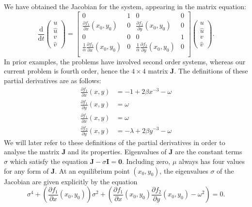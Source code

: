 We have obtained the Jacobian for the system, appearing in the matrix equation:
\begin{equation}
    \frac{\mathrm{d}}{\mathrm{d}t} \begin{pmatrix}
        u \\
        \hat{u} \\
        v \\
        \hat{v}
    \end{pmatrix} = \begin{bmatrix}
        0 & 1 & 0 & 0 \\
        \frac{\partial f_1}{\partial x}(x_0,y_0) & 0 & \frac{\partial f_1}{\partial y}(x_0,y_0) & 0 \\
        0 & 0 & 0 & 1 \\
        \frac{1}{\alpha}\frac{\partial f_2}{\partial x}(x_0,y_0) & 0 & \frac{1}{\alpha}\frac{\partial f_2}{\partial y}(x_0,y_0) & 0 \\
    \end{bmatrix} \begin{pmatrix}
        u \\
        \hat{u} \\
        v \\
        \hat{v}
    \end{pmatrix}.
    \label{eqn:twomass_matrix_jacobian_quad}
\end{equation}
In prior examples, the problems have involved second order systems,
whereas our current problem is fourth order,
hence the \(4\times4\) matrix \(\mathbf{J}\).
The definitions of these partial derivatives are as follows:
\begin{equation}
    \begin{aligned}
        \frac{\partial f_1}{\partial x}(x,y) &= -1 + 2\beta x^{-3} - \omega \\
        \frac{\partial f_1}{\partial y}(x,y) &= \omega \\
        \frac{\partial f_1}{\partial x}(x,y) &= \omega \\
        \frac{\partial f_2}{\partial y}(x,y) &= -\lambda +2\beta y^{-3} - \omega
    \end{aligned}
    \label{eqn:twomass_partial_derivatives}
\end{equation}
We will later refer to these definitions of the partial derivatives in order to analyse the matrix $\mathbf{J}$ and its properties.
Eigenvalues of $\mathbf{J}$ are the constant terms $\sigma$ which satisfy the equation $\mathbf{J} - \sigma \mathbf{I} = \mathbf{0}$.
Including zero, $\mu$ always has four values for any form of $\mathbf{J}$.
At an equilibrium point \((x_0,y_0)\),
the eigenvalues $\sigma$ of the Jacobian are given explicitly by the equation
\begin{equation}
	\sigma^4 + \left(\frac{\partial f_1}{\partial x}(x_0,y_0)\right)\sigma^2 + \left(\frac{\partial f_1}{\partial x}(x_0,y_0) \frac{\partial f_2}{\partial y}(x_0,y_0) - \omega^2\right) = 0.
\end{equation}


